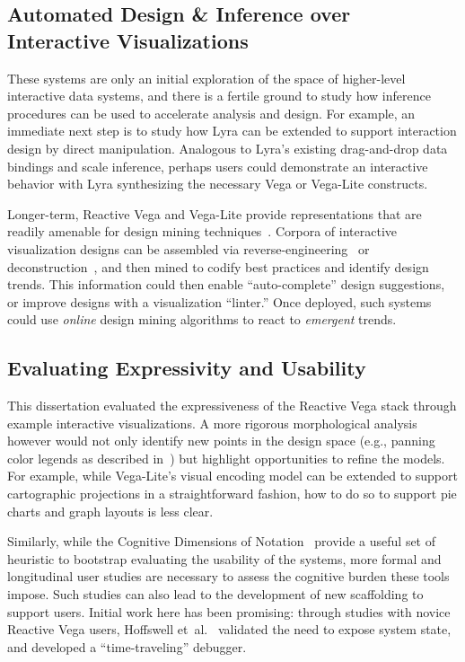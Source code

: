 \subsection{Automated Design \& Inference over Interactive Visualizations}

These systems are only an initial exploration of the space of higher-level
interactive data systems, and there is a fertile ground to study how inference
procedures can be used to accelerate analysis and design. For example, an
immediate next step is to study how Lyra can be extended to support interaction
design by direct manipulation. Analogous to Lyra's existing drag-and-drop data
bindings and scale inference, perhaps users could demonstrate an interactive
behavior with Lyra synthesizing the necessary Vega or Vega-Lite constructs.

Longer-term, Reactive Vega and Vega-Lite provide representations that are
readily amenable for design mining techniques~\cite{kumar:webzeitgeist}. Corpora
of interactive visualization designs can be assembled via
reverse-engineering~\cite{poco:reverse} or
deconstruction~\cite{harper:deconstructing,harper:templates}, and then mined to
codify best practices and identify design trends. This information could then
enable ``auto-complete'' design suggestions, or improve designs with a
visualization ``linter.'' Once deployed, such systems could use \emph{online}
design mining algorithms to react to \emph{emergent} trends.

\subsection{Evaluating Expressivity and Usability}

This dissertation evaluated the expressiveness of the Reactive Vega stack
through example interactive visualizations. A more rigorous morphological
analysis~\cite{card:morphological} however would not only identify new points in
the design space (e.g., panning color legends as described
in~) but highlight opportunities to refine the models.
For example, while Vega-Lite's visual encoding model can be extended to support
cartographic projections in a straightforward fashion, how to do so to support
pie charts and graph layouts is less clear.

Similarly, while the Cognitive Dimensions of Notation~\cite{blackwell:cogdim}
provide a useful set of heuristic to bootstrap evaluating the usability of the
systems, more formal and longitudinal user studies are necessary to assess the
cognitive burden these tools impose. Such studies can also lead to the
development of new scaffolding to support users. Initial work here has been
promising: through studies with novice Reactive Vega users, Hoffswell
et~al.~\cite{hoffswell:debugging} validated the need to expose system state, and
developed a ``time-traveling'' debugger.

